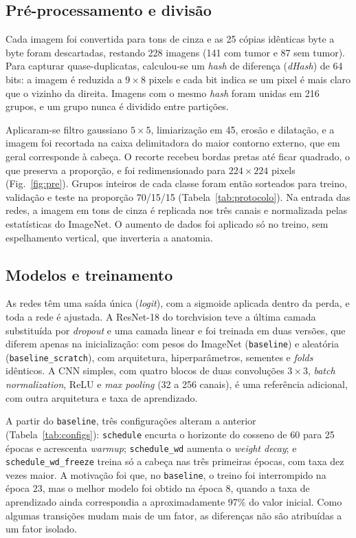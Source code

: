 \documentclass[conference]{IEEEtran}
\begin{document}
\subsection{Pré-processamento e divisão}

Cada imagem foi convertida para tons de cinza e as 25 cópias idênticas byte a byte foram descartadas, restando 228 imagens (141 com tumor e 87 sem tumor). Para capturar quase-duplicatas, calculou-se um \textit{hash} de diferença (\textit{dHash}) de 64 bits: a imagem é reduzida a $9\times8$ pixels e cada bit indica se um pixel é mais claro que o vizinho da direita. Imagens com o mesmo \textit{hash} foram unidas em 216 grupos, e um grupo nunca é dividido entre partições.

Aplicaram-se filtro gaussiano $5\times5$, limiarização em 45, erosão e dilatação, e a imagem foi recortada na caixa delimitadora do maior contorno externo, que em geral corresponde à cabeça. O recorte recebeu bordas pretas até ficar quadrado, o que preserva a proporção, e foi redimensionado para $224\times224$ pixels (Fig.~\ref{fig:pre}). Grupos inteiros de cada classe foram então sorteados para treino, validação e teste na proporção 70/15/15 (Tabela~\ref{tab:protocolo}). Na entrada das redes, a imagem em tons de cinza é replicada nos três canais e normalizada pelas estatísticas do ImageNet. O aumento de dados foi aplicado só no treino, sem espelhamento vertical, que inverteria a anatomia.

\subsection{Modelos e treinamento}

As redes têm uma saída única (\textit{logit}), com a sigmoide aplicada dentro da perda, e toda a rede é ajustada. A ResNet-18 do torchvision teve a última camada substituída por \textit{dropout} e uma camada linear e foi treinada em duas versões, que diferem apenas na inicialização: com pesos do ImageNet (\texttt{baseline}) e aleatória (\texttt{baseline\_scratch}), com arquitetura, hiperparâmetros, sementes e \textit{folds} idênticos. A CNN simples, com quatro blocos de duas convoluções $3\times3$, \textit{batch normalization}, ReLU e \textit{max pooling} (32 a 256 canais), é uma referência adicional, com outra arquitetura e taxa de aprendizado.

A partir do \texttt{baseline}, três configurações alteram a anterior (Tabela~\ref{tab:configs}): \texttt{schedule} encurta o horizonte do cosseno de 60 para 25 épocas e acrescenta \textit{warmup}; \texttt{schedule\_wd} aumenta o \textit{weight decay}; e \texttt{schedule\_wd\_freeze} treina só a cabeça nas três primeiras épocas, com taxa dez vezes maior. A motivação foi que, no \texttt{baseline}, o treino foi interrompido na época 23, mas o melhor modelo foi obtido na época 8, quando a taxa de aprendizado ainda correspondia a aproximadamente 97\% do valor inicial. Como algumas transições mudam mais de um fator, as diferenças não são atribuídas a um fator isolado.
\end{document}
